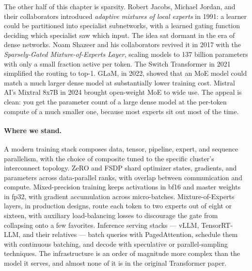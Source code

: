 The other half of this chapter is sparsity. Robert Jacobs, Michael
Jordan, and their collaborators introduced \emph{adaptive mixtures of
local experts} in 1991: a learner could be partitioned into
specialist subnetworks, with a learned gating function deciding which
specialist saw which input. The idea sat dormant in the era of dense
networks. Noam Shazeer and his collaborators revived it in 2017 with
the \emph{Sparsely-Gated Mixture-of-Experts Layer}, scaling models to
137 billion parameters with only a small fraction active per token.
The Switch Transformer in 2021 simplified the routing to top-1.
GLaM, in 2022, showed that an MoE model could match a much larger
dense model at substantially lower training cost. Mistral AI's
Mixtral 8x7B in 2024 brought open-weight MoE to wide use. The
appeal is clean: you get the parameter count of a large dense model
at the per-token compute of a much smaller one, because most experts
sit out most of the time.

\paragraph{Where we stand.}
A modern training stack composes data, tensor, pipeline, expert,
and sequence parallelism, with the choice of composite tuned to the
specific cluster's interconnect topology. ZeRO and FSDP shard
optimizer states, gradients, and parameters across data-parallel
ranks, with overlap between communication and compute. Mixed-precision
training keeps activations in bf16 and master weights in fp32, with
gradient accumulation across micro-batches. Mixture-of-Experts
layers, in production designs, route each token to two experts out
of eight or sixteen, with auxiliary load-balancing losses to
discourage the gate from collapsing onto a few favorites. Inference
serving stacks --- vLLM, TensorRT-LLM, and their relatives --- batch
queries with PagedAttention, schedule them with continuous batching,
and decode with speculative or parallel-sampling techniques. The
infrastructure is an order of magnitude more complex than the model
it serves, and almost none of it is in the original Transformer
paper.

